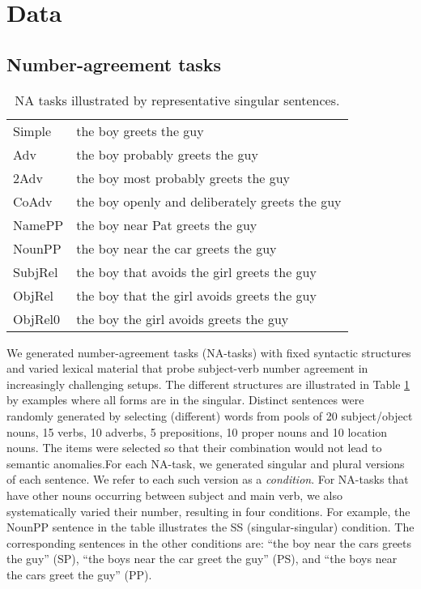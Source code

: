 \section{Data}
\subsection{Number-agreement tasks}

\begin{table}[tb]
  \centering
  \begin{footnotesize}
  \begin{tabular}{l@{\hskip1pt}l}
    \B Simple & the boy greets the guy\\
    \B Adv & the boy probably greets the guy\\
    \B 2Adv & the boy most probably greets the guy\\
    \B CoAdv &  the boy openly and deliberately greets the guy\\
    \B NamePP & the boy near Pat greets the guy\\
    \B NounPP & the boy near the car greets the guy\\
    \B SubjRel & the boy that avoids the girl greets the guy\\
    \B ObjRel  & the boy that the girl avoids greets the guy \\
    \B ObjRel0 &  the boy the girl avoids greets the guy\\
  \end{tabular}
  \end{footnotesize}
  \caption{NA tasks illustrated by representative
    singular sentences.}
  \label{tab:data-sets}
\end{table}

We generated number-agreement tasks (NA-tasks) with fixed syntactic
structures and varied lexical material that probe subject-verb number
agreement in increasingly challenging setups. The different structures
are illustrated in Table \ref{tab:data-sets} by examples where all
forms are in the singular. Distinct sentences were randomly generated
by selecting (different) words from pools of 20 subject/object nouns,
15 verbs, 10 adverbs, 5 prepositions, 10 proper nouns and 10 location
nouns. The items were selected so that their combination would not
lead to semantic anomalies.For each NA-task, we generated singular and
plural versions of each sentence. We refer to each such version as a
\textit{condition}. For NA-tasks that have other nouns occurring between
subject and main verb, we also systematically varied their number,
resulting in four conditions. For example, the NounPP sentence in the
table illustrates the SS (singular-singular) condition. The
corresponding sentences in the other conditions are: ``the boy near
the cars greets the guy'' (SP), ``the boys near the car greet the
guy'' (PS), and ``the boys near the cars greet the guy'' (PP).


